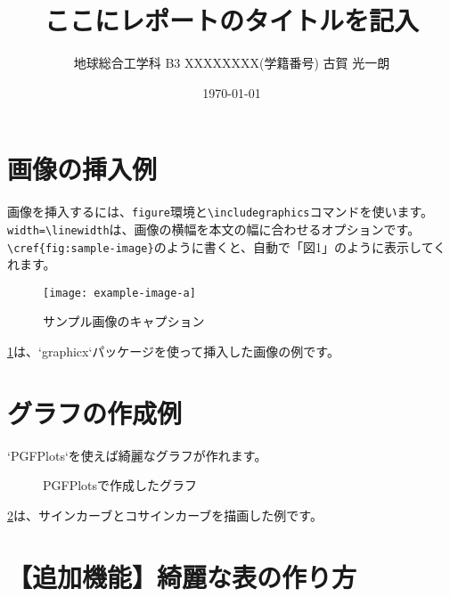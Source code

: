 \documentclass[11pt, dvipdfmx]{jsarticle}
\title{ここにレポートのタイトルを記入}
\author{地球総合工学科 \quad B3 \quad XXXXXXXX(学籍番号) \quad 古賀 光一朗}
\date{\today}
\begin{document}
\maketitle

\section{画像の挿入例}

画像を挿入するには、\verb|figure|環境と\verb|\includegraphics|コマンドを使います。
\verb|width=\linewidth|は、画像の横幅を本文の幅に合わせるオプションです。
\verb|\cref{fig:sample-image}|のように書くと、自動で「図1」のように表示してくれます。

\begin{figure}[H]
    \centering
    \texttt{[image: example-image-a]}
    \caption{サンプル画像のキャプション}
    \label{fig:sample-image}
\end{figure}

\cref{fig:sample-image}は、`graphicx`パッケージを使って挿入した画像の例です。

\section{グラフの作成例}

`PGFPlots`を使えば綺麗なグラフが作れます。

\begin{figure}[H]
    \centering
    \caption{PGFPlotsで作成したグラフ}
    \label{fig:sample-graph}
\end{figure}

\cref{fig:sample-graph}は、サインカーブとコサインカーブを描画した例です。

\section{【追加機能】綺麗な表の作り方}
\end{document}
